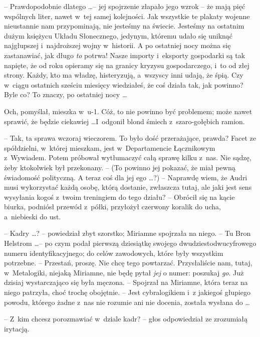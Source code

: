 \documentclass[oneside,polish,11pt,rmheadings]{mwbk}
\begin{document}
-- Prawdopodobnie dlatego \ldots  -- jej spojrzenie złapało jego wzrok -- że mają pięć wspólnych liter, nawet w~tej samej kolejności. Jak wszystkie te plakaty wojenne nieustannie nam przypominają, nie jesteśmy na świecie.  Jesteśmy na ostatnim dużym księżycu Układu Słonecznego, jedynym, któremu udało się uniknąć najgłupszej i~najdroższej wojny w~historii. A po ostatniej nocy można się zastanawiać, jak długo \textit{to }potrwa! Nasze importy i~eksporty gospodarki są tak napięte, że od roku opieramy się na granicy kryzysu gospodarczego, i~to od złej strony. Każdy, kto ma władzę, histeryzują, a~wszyscy inni udają, że śpią. Czy w~ciągu ostatnich sześciu miesięcy wiedziałeś, że coś działa tak, jak powinno? Byle co? To znaczy, po ostatniej nocy  \ldots  

Och, pomyślał, mieszka w~u-1.  Cóż, to nie powinno być problemem; może nawet sprawić, że będzie ciekawiej \ldots  I~odgonił blond śmiech z~szaro-gołębich ramion. 

-- Tak, ta sprawa wczoraj wieczorem.  To było dość przerażające, prawda? Facet ze spółdzielni, w~której mieszkam, jest w~Departamencie Łącznikowym z~Wywiadem. Potem próbował wytłumaczyć całą sprawę kilku z~nas. Nie sądzę, żeby ktokolwiek był przekonany. -- (To powinno jej pokazać, że miał pewną świadomość polityczną. A teraz coś dla jej ego \ldots ?) -- Naprawdę wiem, że Audri musi wykorzystać każdą osobę, którą dostanie, zwłaszcza tutaj, ale jaki jest sens wysyłania kogoś z~twoim treningiem do tego działu? -- Obrócił się na kącie biurka, podniósł przewód z~półki, przyłożył czerwony koralik do ucha, a~niebieski do ust. 

-- Kadry \ldots ? -- powiedział zbyt szorstko; Miriamne spojrzała na niego. -- Tu Bron Helstrom \ldots  -- po czym podał pierwszą dziesiątkę swojego dwudziestodwucyfrowego numeru identyfikacyjnego; do celów zawodowych, które były wszystkim potrzebne. -- Przestań, proszę. Nie chcę tego powtarzać. Przysłaliście nam, tutaj, w~Metalogiki, niejaką Miriamne, nie będę pytał \textit{jej }o numer: poszukaj \textit{go}.  Już dzisiaj wystarczająco się była męczona. -- Spojrzał na Miriamne, która teraz na niego patrzyła, choć trochę obojętnie. -- Jest cybralogikiem i~z jakiegoś głupiego powodu, którego żadne z~nas nie rozumie ani nie docenia, została wysłana do \ldots  

-- Z~kim chcesz porozmawiać w~dziale kadr? -- głos odpowiedział ze zrozumiałą irytacją. 
\end{document}
